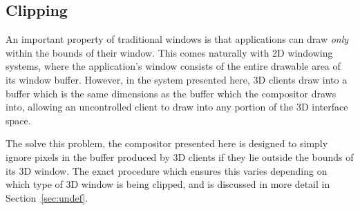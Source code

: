 \subsection{Clipping}
\label{sec:clipping}

An important property of traditional windows is that applications can draw \textit{only} within the bounds of their window. This comes naturally with 2D windowing systems, where the application's window consists of the entire drawable area of its window buffer. However, in the system presented here, 3D clients draw into a buffer which is the same dimensions as the buffer which the compositor draws into, allowing an uncontrolled client to draw into any portion of the 3D interface space.

The solve this problem, the compositor presented here is designed to simply ignore pixels in the buffer produced by 3D clients if they lie outside the bounds of its 3D window. The exact procedure which ensures this varies depending on which type of 3D window is being clipped, and is discussed in more detail in Section~\ref{sec:undef}.
